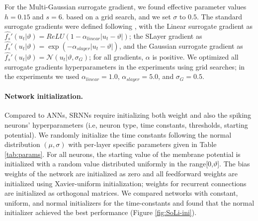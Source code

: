 \documentclass[fleqn,10pt]{wlscirep}
\begin{document}
For the Multi-Gaussian surrogate gradient, we found effective parameter values $h=0.15$ and $s=6.$ based on a grid search, and we set $\sigma$ to $0.5$. The standard surrogate gradients were defined following \cite{neftci2019surrogate}, with the Linear surrogate gradient as $\hat{f_s}'(u_{t}|\vartheta) = ReLU( 1-\alpha_{linear} |u_t-\vartheta|)$; the SLayer\cite{shrestha2018slayer}  gradient  as $\hat{f_s}'(u_{t}|\vartheta) = \exp( -\alpha_{slayer} |u_t-\vartheta|)$, and the Gaussian surrogate gradient as $\hat{f_s}'(u_{t}|\vartheta) = \mathcal{N}( u_t|\vartheta,\sigma_G)$; for all gradients, $\alpha$ is positive. We optimized all surrogate gradients hyperparameters in the experiments using grid searches; in the experiments we used  $\alpha_{linear} = 1.0$, $\alpha_{slayer} = 5.0$, and $\sigma_G = 0.5$. 

\paragraph{Network initialization.}  Compared to ANNs, SRNNs require initializing both weight and also the spiking neurons' hyperparameters (i.e, neuron type, time constants, thresholds, starting potential). We randomly initialize the time constants following the normal distribution $(\mu,\sigma)$ with per-layer specific parameters given in Table \ref{tab:params}. For all neurons, the starting value of the membrane potential is initialized with a random value distributed uniformly in the range[0,$\vartheta$]. The bias weights of the network are initialized as zero and all feedforward weights are initialized using Xavier-uniform initialization; weights for recurrent connections are initialized as orthogonal matrices. We compared networks with constant, uniform, and normal initializers for the time-constants and found that the normal initializer achieved the best performance (Figure \ref{fig:SoLi-ini}). 
\end{document}
